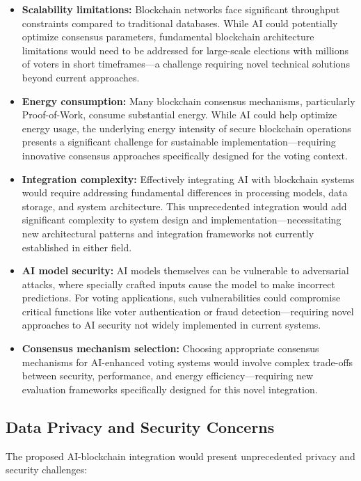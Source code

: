 \documentclass[conference]{IEEEtran}
\begin{document}
\begin{itemize}
    \item \textbf{Scalability limitations:} Blockchain networks face significant throughput constraints compared to traditional databases. While AI could potentially optimize consensus parameters, fundamental blockchain architecture limitations would need to be addressed for large-scale elections with millions of voters in short timeframes—a challenge requiring novel technical solutions beyond current approaches.
    
    \item \textbf{Energy consumption:} Many blockchain consensus mechanisms, particularly Proof-of-Work, consume substantial energy. While AI could help optimize energy usage, the underlying energy intensity of secure blockchain operations presents a significant challenge for sustainable implementation—requiring innovative consensus approaches specifically designed for the voting context.
    
    \item \textbf{Integration complexity:} Effectively integrating AI with blockchain systems would require addressing fundamental differences in processing models, data storage, and system architecture. This unprecedented integration would add significant complexity to system design and implementation—necessitating new architectural patterns and integration frameworks not currently established in either field.
    
    \item \textbf{AI model security:} AI models themselves can be vulnerable to adversarial attacks, where specially crafted inputs cause the model to make incorrect predictions. For voting applications, such vulnerabilities could compromise critical functions like voter authentication or fraud detection—requiring novel approaches to AI security not widely implemented in current systems.
    
    \item \textbf{Consensus mechanism selection:} Choosing appropriate consensus mechanisms for AI-enhanced voting systems would involve complex trade-offs between security, performance, and energy efficiency—requiring new evaluation frameworks specifically designed for this novel integration.
\end{itemize}

\subsection{Data Privacy and Security Concerns}
The proposed AI-blockchain integration would present unprecedented privacy and security challenges:
\end{document}
